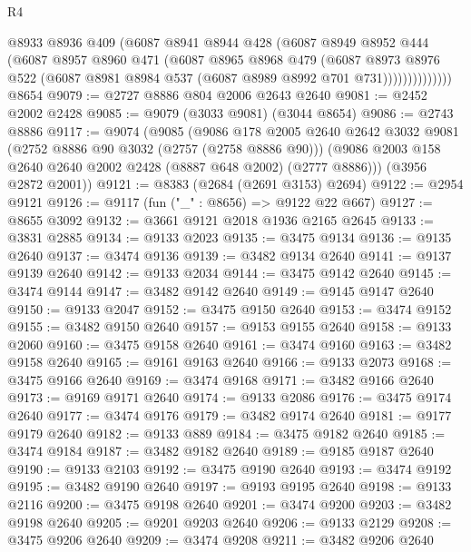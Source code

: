 \begin{lexlean}{R4}
\begin{coremodule}
                  @8933
                  @8936
                  @409
                  (@6087
                    @8941
                    @8944
                    @428
                    (@6087
                      @8949
                      @8952
                      @444
                      (@6087
                        @8957
                        @8960
                        @471
                        (@6087
                          @8965
                          @8968
                          @479
                          (@6087
                            @8973
                            @8976
                            @522
                            (@6087 @8981 @8984 @537 (@6087 @8989 @8992 @701 @731))))))))))))))
    @8654
@9079 := @2727 @8886 @804 @2006 @2643 @2640
@9081 := @2452 @2002 @2428
@9085 := @9079 (@3033 @9081) (@3044 @8654)
@9086 := @2743 @8886
@9117 := @9074
    (@9085
      (@9086
        @178
        @2005
        @2640
        @2642
        @3032
        @9081
        (@2752 @8886 @90 @3032 (@2757 (@2758 @8886 @90)))
        (@9086 @2003 @158 @2640 @2640 @2002 @2428 (@8887 @648 @2002) (@2777 @8886)))
      (@3956 @2872 @2001))
@9121 := @8383 (@2684 (@2691 @3153) @2694)
@9122 := @2954 @9121
@9126 := @9117 (fun ("_" : @8656) => @9122 @22 @667)
@9127 := @8655 @3092
@9132 := @3661 @9121 @2018 @1936 @2165 @2645
@9133 := @3831 @2885
@9134 := @9133 @2023
@9135 := @3475 @9134
@9136 := @9135 @2640
@9137 := @3474 @9136
@9139 := @3482 @9134 @2640
@9141 := @9137 @9139 @2640
@9142 := @9133 @2034
@9144 := @3475 @9142 @2640
@9145 := @3474 @9144
@9147 := @3482 @9142 @2640
@9149 := @9145 @9147 @2640
@9150 := @9133 @2047
@9152 := @3475 @9150 @2640
@9153 := @3474 @9152
@9155 := @3482 @9150 @2640
@9157 := @9153 @9155 @2640
@9158 := @9133 @2060
@9160 := @3475 @9158 @2640
@9161 := @3474 @9160
@9163 := @3482 @9158 @2640
@9165 := @9161 @9163 @2640
@9166 := @9133 @2073
@9168 := @3475 @9166 @2640
@9169 := @3474 @9168
@9171 := @3482 @9166 @2640
@9173 := @9169 @9171 @2640
@9174 := @9133 @2086
@9176 := @3475 @9174 @2640
@9177 := @3474 @9176
@9179 := @3482 @9174 @2640
@9181 := @9177 @9179 @2640
@9182 := @9133 @889
@9184 := @3475 @9182 @2640
@9185 := @3474 @9184
@9187 := @3482 @9182 @2640
@9189 := @9185 @9187 @2640
@9190 := @9133 @2103
@9192 := @3475 @9190 @2640
@9193 := @3474 @9192
@9195 := @3482 @9190 @2640
@9197 := @9193 @9195 @2640
@9198 := @9133 @2116
@9200 := @3475 @9198 @2640
@9201 := @3474 @9200
@9203 := @3482 @9198 @2640
@9205 := @9201 @9203 @2640
@9206 := @9133 @2129
@9208 := @3475 @9206 @2640
@9209 := @3474 @9208
@9211 := @3482 @9206 @2640

\end{coremodule}
\end{lexlean}
